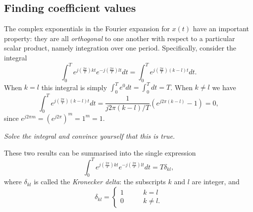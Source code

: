 \documentclass[10pt]{beamer}
\begin{document}
\subsection{Finding coefficient values}

The complex exponentials in the Fourier expansion for $x(t)$ have an important property:  they are all {\em orthogonal} to one another with respect to a particular scalar product, namely integration over one period.  Specifically, consider the integral 
\begin{equation*}
  \int_0^T e^{j \left( \frac{2 \pi}{T} \right) k t} e^{-j \left( \frac{2 \pi}{T} \right) l t} dt = \int_0^T e^{j \left( \frac{2 \pi}{T} \right) (k-l) t} dt.
\end{equation*}
When $k=l$ this integral is simply $\int_0^T e^0 dt = \int_0^T dt = T$.  When $k \neq l$ we have
\begin{equation*}
  \int_0^T e^{j \left( \frac{2 \pi}{T} \right) (k-l) t} dt = \frac{1}{j 2 \pi (k-l)/T} (e^{j 2 \pi (k-l)} - 1) = 0,
\end{equation*}
since $e^{j 2 \pi m} = (e^{j 2 \pi})^m = 1^m = 1$.  

{\em Solve the integral and convince yourself that this is true.}

These two results can be summarised into the single expression
\begin{equation*}
  \int_0^T e^{j \left( \frac{2 \pi}{T} \right) k t} e^{-j \left( \frac{2 \pi}{T} \right) l t} dt = T \delta_{kl},
\end{equation*}
where $\delta_{kl}$ is called the {\em Kronecker delta}:  the subscripts $k$ and $l$ are integer, and
\begin{equation*}
  \delta_{kl} = \begin{cases} 1 \qquad & k = l \\ 0 \qquad & k \neq l. \end{cases}
\end{equation*}
\end{document}
